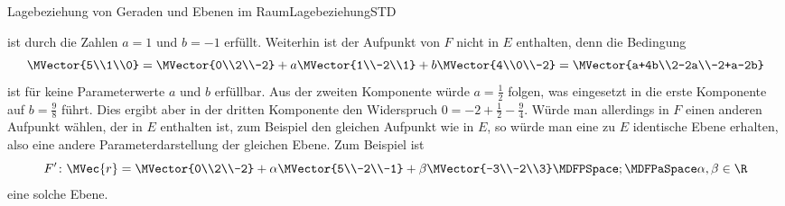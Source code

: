 \begin{MXContent}{Lagebeziehung von Geraden und Ebenen im Raum}{Lagebeziehung}{STD}
\begin{MExample}
\begin{itemize}
\[ \]
 ist durch die Zahlen $a=1$ und $b=-1$ erfüllt. Weiterhin ist der Aufpunkt von $F$ nicht in $E$ enthalten, denn die Bedingung
 \[
  \MVector{5\\1\\0}=\MVector{0\\2\\-2}+a\MVector{1\\-2\\1}+b\MVector{4\\0\\-2}=\MVector{a+4b\\2-2a\\-2+a-2b}
 \]
 ist für keine Parameterwerte $a$ und $b$ erfüllbar. Aus der zweiten Komponente würde $a=\frac{1}{2}$ folgen, was eingesetzt in die erste Komponente auf $b=\frac{9}{8}$ führt. Dies ergibt aber in der dritten Komponente den Widerspruch $0=-2+\frac{1}{2}-\frac{9}{4}$. Würde man allerdings in $F$ einen anderen Aufpunkt wählen, der in $E$ enthalten ist, zum Beispiel den gleichen Aufpunkt wie in $E$, so würde man eine zu $E$ identische Ebene erhalten, also eine andere Parameterdarstellung der gleichen Ebene. Zum Beispiel ist
 \[
  F^{\prime}\colon\MVec{r}=\MVector{0\\2\\-2}+\alpha\MVector{5\\-2\\-1}+\beta\MVector{-3\\-2\\3}\MDFPSpace;\MDFPaSpace \alpha,\beta\in\R
 \]
 eine solche Ebene.
 

\end{itemize}
\end{MExample}
\end{MXContent}
